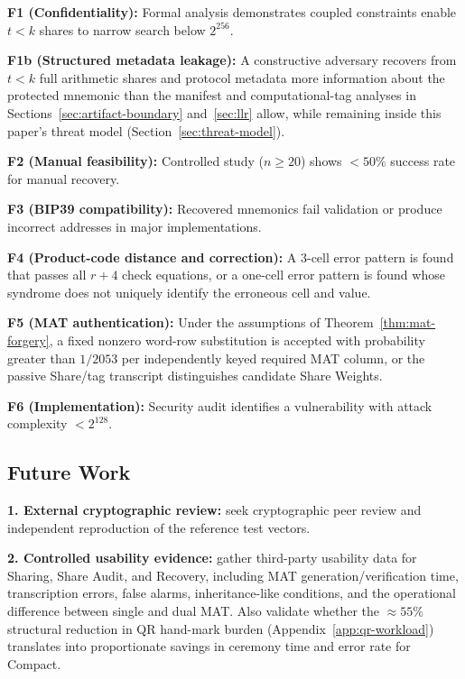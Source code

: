 \documentclass[11pt]{article}
\begin{document}
\textbf{F1 (Confidentiality):} Formal analysis demonstrates coupled constraints enable $t < k$ shares to narrow search below $2^{256}$.

\textbf{F1b (Structured metadata leakage):} A constructive adversary recovers from $t < k$ full arithmetic shares and protocol metadata more information about the protected mnemonic than the manifest and computational-tag analyses in Sections~\ref{sec:artifact-boundary} and~\ref{sec:llr} allow, while remaining inside this paper's threat model (Section~\ref{sec:threat-model}).

\textbf{F2 (Manual feasibility):} Controlled study ($n \geq 20$) shows $< 50\%$ success rate for manual recovery.

\textbf{F3 (BIP39 compatibility):} Recovered mnemonics fail validation or produce incorrect addresses in major implementations.

\textbf{F4 (Product-code distance and correction):} A 3-cell error pattern is found that passes all $r + 4$ check equations, or a one-cell error pattern is found whose syndrome does not uniquely identify the erroneous cell and value.

\textbf{F5 (MAT authentication):} Under the assumptions of Theorem~\ref{thm:mat-forgery}, a fixed nonzero word-row substitution is accepted with probability greater than $1/2053$ per independently keyed required MAT column, or the passive Share/tag transcript distinguishes candidate Share Weights.

\textbf{F6 (Implementation):} Security audit identifies a vulnerability with attack complexity $< 2^{128}$.

\subsection{Future Work}

\textbf{1. External cryptographic review:} seek cryptographic peer review and independent reproduction of the reference test vectors.

\textbf{2. Controlled usability evidence:} gather third-party usability data for Sharing, Share Audit, and Recovery, including MAT generation/verification time, transcription errors, false alarms, inheritance-like conditions, and the operational difference between single and dual MAT. Also validate whether the ${\approx}55\%$ structural reduction in QR hand-mark burden (Appendix~\ref{app:qr-workload}) translates into proportionate savings in ceremony time and error rate for Compact.
\end{document}

